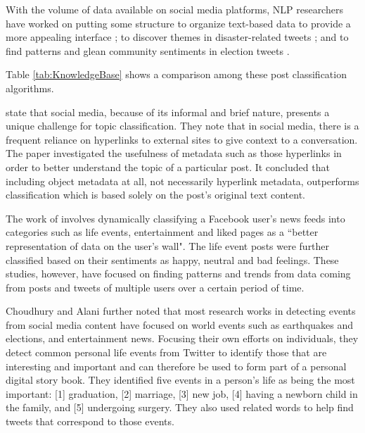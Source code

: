 With the volume of data available on social media platforms, NLP researchers have worked on putting some structure to organize text-based data to provide a more appealing interface \cite{setty2014classification}; to discover themes in disaster-related tweets \cite{syliongka2015combining}; and to find patterns and glean community sentiments in election tweets \cite{wang2012system}.

Table \ref{tab:KnowledgeBase} shows a comparison among these post classification algorithms.

\cite{DBLP:conf/ecir/KinsellaPB11} state that social media, because of its informal and brief nature, presents a unique challenge for topic classification. They note that in social media, there is a frequent reliance on hyperlinks to external sites to give context to a conversation. The paper investigated the usefulness of metadata such as those hyperlinks in order to better understand the topic of a particular post. It concluded that including object metadata at all, not necessarily hyperlink metadata, outperforms classification which is based solely on the post's original text content. 

The work of \cite{setty2014classification} involves dynamically classifying a Facebook user's news feeds into categories such as life events, entertainment and liked pages as a ``better representation of data on the user's wall". The life event posts were further classified based on their sentiments as happy, neutral and bad feelings. These studies, however, have focused on finding patterns and trends from data coming from posts and tweets of multiple users over a certain period of time. 

Choudhury and Alani \citeyear{choudhury2014personal} further noted that most research works in detecting events from social media content have focused on world events such as earthquakes and elections, and entertainment news. Focusing their own efforts on individuals, they detect common personal life events from Twitter to identify those that are interesting and important and can therefore be used to form part of a personal digital story book. They identified five events in a person's life as being the most important: [1] graduation, [2] marriage, [3] new job, [4] having a newborn child in the family, and [5] undergoing surgery. They also used related words to help find tweets that correspond to those events.

